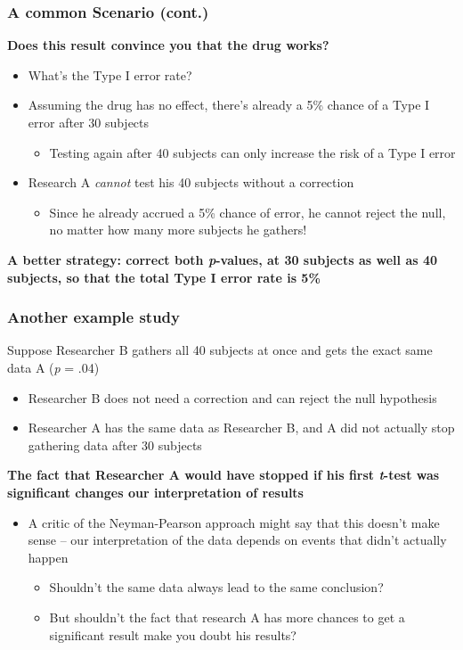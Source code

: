 \documentclass[10pt, block=fill]{beamer}
\begin{document}
\begin{frame}
  \frametitle{A common Scenario (cont.)}
  
  \textbf{Does this result convince you that the drug works?}
  \begin{itemize}
      \item What's the Type I error rate?
      \item Assuming the drug has no effect, there's already a 5\% chance of a Type I error after 30 subjects
      \begin{itemize}
          \item Testing again after 40 subjects can only increase the risk of a Type I error
      \end{itemize}
      \item Research A \textit{cannot} test his 40 subjects without a correction
      \begin{itemize}
          \item Since he already accrued a 5\% chance of error, he cannot reject the null, no matter how many more subjects he gathers!
      \end{itemize}
  \end{itemize}
  
   \textbf{A better strategy: correct both \textit{p}-values, at 30 subjects as well as 40 subjects, so that the total Type I error rate is 5\%}
\end{frame}


\begin{frame}
   \frametitle{Another example study}

   Suppose Researcher B gathers all 40 subjects at once and gets the exact same data A (\textit{p} = .04)   
   \begin{itemize}
       \item Researcher B does not need a correction and can reject the null hypothesis
       \item Researcher A has the same data as Researcher B, and A did not actually stop gathering data after 30 subjects
   \end{itemize}
   
   \textbf{The fact that Researcher A would have stopped if his first \textit{t}-test was significant changes our interpretation of results}
   \begin{itemize}
       \item A critic of the Neyman-Pearson approach might say that this doesn't make sense -- our interpretation of the data depends on events that didn't actually happen
       \begin{itemize}
           \item Shouldn't the same data always lead to the same conclusion?
           \item But shouldn't the fact that research A has more chances to get a significant result make you doubt his results?
       \end{itemize}
   \end{itemize}
    
\end{frame}
\end{document}
